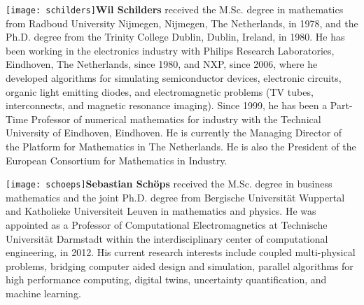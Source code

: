 \documentclass[AMA,STIX1COL]{WileyNJD-v2}
\begin{document}
\begin{biography}{\texttt{[image: schilders]}}{\textbf{Wil Schilders} received the M.Sc. degree in mathematics from Radboud University Nijmegen, Nijmegen, The Netherlands, in 1978, and the Ph.D. degree from the Trinity College Dublin, Dublin, Ireland, in 1980. He has been working in the electronics industry with Philips Research Laboratories, Eindhoven, The Netherlands, since 1980, and NXP, since 2006, where he developed algorithms for simulating semiconductor devices, electronic circuits, organic light emitting diodes, and electromagnetic problems (TV tubes, interconnects, and magnetic resonance imaging). Since 1999, he has been a Part-Time Professor of numerical mathematics for industry with the Technical University of Eindhoven, Eindhoven. He is currently the Managing Director of the Platform for Mathematics in The Netherlands. He is also the President of the European Consortium for Mathematics in Industry.}
\end{biography}
\vspace{0.5cm}
\begin{biography}{\texttt{[image: schoeps]}}{\textbf{Sebastian Schöps} received the M.Sc. degree in business mathematics and the joint Ph.D. degree from Bergische Universität Wuppertal and Katholieke Universiteit Leuven in mathematics and physics. He was appointed as a Professor of Computational Electromagnetics at Technische Universität Darmstadt within the interdisciplinary center of computational engineering, in 2012. His current research interests include coupled multi-physical problems, bridging computer aided design and simulation, parallel algorithms for high performance computing, digital twins, uncertainty quantification, and machine learning.}
\end{biography}
\end{document}
